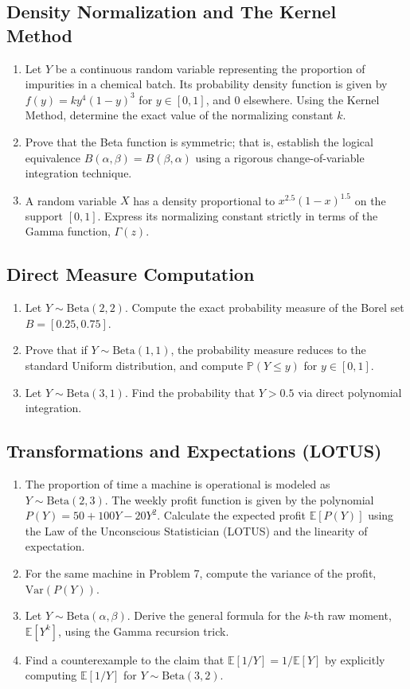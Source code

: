 \documentclass[11pt, a4paper]{article}
\theoremstyle{definition}
\theoremstyle{remark}
\newcommand{\E}{\mathbb{E}}
\newcommand{\Prob}{\mathbb{P}}
\begin{document}
\subsection{Density Normalization and The Kernel Method}
\begin{enumerate}[label=\textbf{\arabic*.}]
    \item Let $Y$ be a continuous random variable representing the proportion of impurities in a chemical batch. Its probability density function is given by $f(y) = k y^4 (1-y)^3$ for $y \in [0, 1]$, and $0$ elsewhere. Using the Kernel Method, determine the exact value of the normalizing constant $k$.
    \item Prove that the Beta function is symmetric; that is, establish the logical equivalence $B(\alpha, \beta) = B(\beta, \alpha)$ using a rigorous change-of-variable integration technique.
    \item A random variable $X$ has a density proportional to $x^{2.5} (1-x)^{1.5}$ on the support $[0, 1]$. Express its normalizing constant strictly in terms of the Gamma function, $\Gamma(z)$.
\end{enumerate}

\subsection{Direct Measure Computation}
\begin{enumerate}[label=\textbf{\arabic*.}, resume]
    \item Let $Y \sim \text{Beta}(2, 2)$. Compute the exact probability measure of the Borel set $B = [0.25, 0.75]$.
    \item Prove that if $Y \sim \text{Beta}(1, 1)$, the probability measure reduces to the standard Uniform distribution, and compute $\Prob(Y \le y)$ for $y \in [0, 1]$.
    \item Let $Y \sim \text{Beta}(3, 1)$. Find the probability that $Y > 0.5$ via direct polynomial integration.
\end{enumerate}

\subsection{Transformations and Expectations (LOTUS)}
\begin{enumerate}[label=\textbf{\arabic*.}, resume]
    \item The proportion of time a machine is operational is modeled as $Y \sim \text{Beta}(2, 3)$. The weekly profit function is given by the polynomial $P(Y) = 50 + 100Y - 20Y^2$. Calculate the expected profit $\E[P(Y)]$ using the Law of the Unconscious Statistician (LOTUS) and the linearity of expectation.
    \item For the same machine in Problem 7, compute the variance of the profit, $\text{Var}(P(Y))$.
    \item Let $Y \sim \text{Beta}(\alpha, \beta)$. Derive the general formula for the $k$-th raw moment, $\E[Y^k]$, using the Gamma recursion trick.
    \item Find a counterexample to the claim that $\E[1/Y] = 1/\E[Y]$ by explicitly computing $\E[1/Y]$ for $Y \sim \text{Beta}(3, 2)$.
\end{enumerate}
\end{document}

